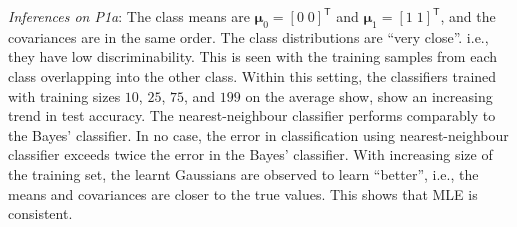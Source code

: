\documentclass[11pt, a4 paper]{article}
\newcommand{\TT}{\mathsf{T}}
\newcommand{\bmu}{\boldsymbol{\mu}}
\begin{document}
{\it Inferences on P1a}: The class means are $\bmu_{0} = [0 \; 0]^{\TT}$ and $\bmu_{1} = [1 \; 1]^{\TT}$, and the covariances are in the same order. The class distributions are ``very close''. i.e., they have low discriminability. This is seen with the training samples from each class overlapping into the other class. Within this setting, the classifiers trained with training sizes $10$, $25$, $75$, and $199$ on the average show, show an increasing trend in test accuracy. The nearest-neighbour classifier performs comparably to the Bayes' classifier. In no case, the error in classification using nearest-neighbour classifier exceeds twice the error in the Bayes' classifier. With increasing size of the training set, the learnt Gaussians are observed to learn ``better'', i.e., the means and covariances are closer to the true values. This shows that MLE is consistent.
\end{document}
